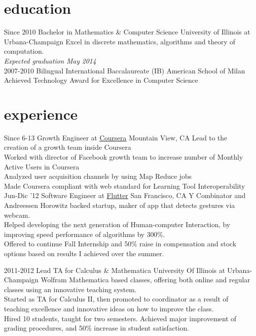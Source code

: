 \documentclass[]{mre-cv}
\begin{document}
\section{education}

\begin{entrylist}
  \entry
    {Since 2010}
    {Bachelor in Mathematics \& Computer Science }
    {University of Illinois at Urbana-Champaign}
    { Excel in discrete mathematics, algorithms and theory of computation.\\
    \emph{Expected graduation May 2014}\\}
  \entry
    {2007-2010}
    {Bilingual International Baccalaureate (IB)}
    {American School of Milan}
    {Achieved Technology Award for Excellence in Computer Science}
    \vspace{.14cm}
\end{entrylist}

\section{experience}

\begin{entrylist}
  \entry
    {Since 6-13}
    {Growth Engineer at \href{http://www.coursera.org}{\underline{Coursera}}}
    {Mountain View, CA}
    {Lead to the creation of a growth team inside Coursera  \\
     Worked with director of Facebook growth team to increase number of Monthly Active Users in Coursera \\
     Analyzed user acquisition channels by using Map Reduce jobs \\
     Made Coursera compliant with web standard for Learning Tool Interoperability 
    }
  \entry
    {Jun-Dic '12}
    {Software Engineer at \href{http://www.flutterapp.com}{\underline{Flutter}}}
    {San Francisco, CA}
    {Y Combinator and Andreessen Horowitz backed startup, maker of app that detects  gestures via webcam. \\
    Helped developing the next generation of Human-computer Interaction, by improving speed performance of algorithms by 300\%. \\
    Offered to continue Fall Internship and 50\% raise in compensation and stock options based on results I achieved over the summer.\\
    }
    
    \entry
    {2011-2012}
    {Lead TA for Calculus \& Mathematica}
    {University Of Illinois at Urbana-Champaign}
    { Wolfram Mathematica based classes, offering both online and regular classes using an innovative teaching system.\\
    Started as TA for Calculus II, then promoted to coordinator as a result of teaching excellence and innovative ideas on how to improve the class.\\
    Hired 10 students, taught for two semesters. Achieved major improvement of grading procedures, and 50\% increase in student satisfaction. \\}
\end{entrylist}
\end{document}

